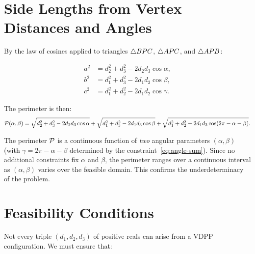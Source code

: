 \section{Side Lengths from Vertex Distances and Angles}

By the law of cosines applied to triangles $\triangle BPC$, $\triangle APC$, and $\triangle APB$:

\begin{align}
a^2 &= d_2^2 + d_3^2 - 2d_2 d_3 \cos\alpha, \label{eq:side-a-formal} \\
b^2 &= d_1^2 + d_3^2 - 2d_1 d_3 \cos\beta, \label{eq:side-b-formal} \\
c^2 &= d_1^2 + d_2^2 - 2d_1 d_2 \cos\gamma. \label{eq:side-c-formal}
\end{align}

The perimeter is then:
\begin{equation}
\label{eq:perimeter-formal}
\mathcal{P}(\alpha, \beta) = \sqrt{d_2^2 + d_3^2 - 2d_2 d_3 \cos\alpha} + \sqrt{d_1^2 + d_3^2 - 2d_1 d_3 \cos\beta} + \sqrt{d_1^2 + d_2^2 - 2d_1 d_2 \cos(2\pi - \alpha - \beta)}.
\end{equation}

\begin{observation}
The perimeter $\mathcal{P}$ is a continuous function of \emph{two} angular parameters $(\alpha, \beta)$ (with $\gamma = 2\pi - \alpha - \beta$ determined by the constraint~\eqref{eq:angle-sum}). Since no additional constraints fix $\alpha$ and $\beta$, the perimeter ranges over a continuous interval as $(\alpha, \beta)$ varies over the feasible domain. This confirms the underdeterminacy of the problem.
\end{observation}

\section{Feasibility Conditions}

Not every triple $(d_1, d_2, d_3)$ of positive reals can arise from a VDPP configuration. We must ensure that:

